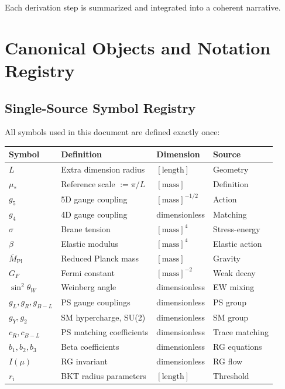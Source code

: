 \documentclass[11pt,a4paper]{article}
\begin{document}
Each derivation step is summarized and integrated into a coherent narrative.

\section{Canonical Objects and Notation Registry}
\label{sec:notation}

\subsection{Single-Source Symbol Registry}
\label{subsec:symbol-registry}

All symbols used in this document are defined exactly once:

\begin{canonbox}
\label{box:notation-registry}
\begin{center}
\begin{longtable}{llll}
\toprule
\textbf{Symbol} & \textbf{Definition} & \textbf{Dimension} & \textbf{Source} \\
\midrule
\endhead
$L$ & Extra dimension radius & $[\text{length}]$ & Geometry \\
$\mu_*$ & Reference scale $:= \pi/L$ & $[\text{mass}]$ & Definition \\
$g_5$ & 5D gauge coupling & $[\text{mass}]^{-1/2}$ & Action \\
$g_4$ & 4D gauge coupling & dimensionless & Matching \\
$\sigma$ & Brane tension & $[\text{mass}]^4$ & Stress-energy \\
$\beta$ & Elastic modulus & $[\text{mass}]^4$ & Elastic action \\
$\bar{M}_{\text{Pl}}$ & Reduced Planck mass & $[\text{mass}]$ & Gravity \\
$G_F$ & Fermi constant & $[\text{mass}]^{-2}$ & Weak decay \\
$\sin^2\theta_W$ & Weinberg angle & dimensionless & EW mixing \\
$g_L, g_R, g_{B-L}$ & PS gauge couplings & dimensionless & PS group \\
$g_Y, g_2$ & SM hypercharge, SU(2) & dimensionless & SM group \\
$c_R, c_{B-L}$ & PS matching coefficients & dimensionless & Trace matching \\
$b_1, b_2, b_3$ & Beta coefficients & dimensionless & RG equations \\
$I(\mu)$ & RG invariant & dimensionless & RG flow \\
$r_i$ & BKT radius parameters & $[\text{length}]$ & Threshold \\
\bottomrule
\end{longtable}
\end{center}
\end{canonbox}
\end{document}
